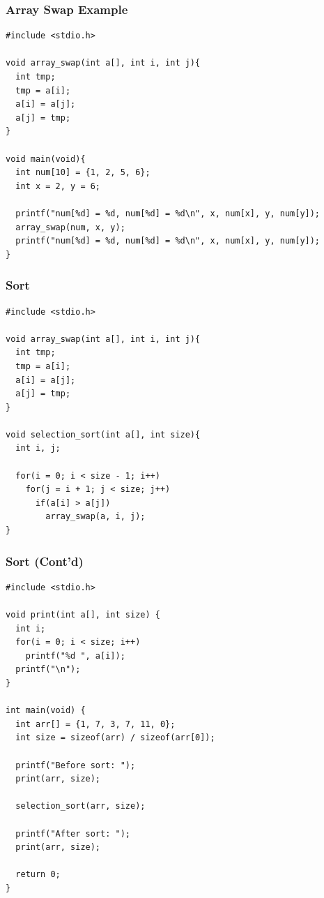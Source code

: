 \documentclass{../c-lecture}
\begin{document}
\begin{frame}[fragile]
  \frametitle{Array Swap Example}
  \scriptsize
  \begin{verbatim}
#include <stdio.h>

void array_swap(int a[], int i, int j){
  int tmp;
  tmp = a[i];
  a[i] = a[j];
  a[j] = tmp;
}

void main(void){
  int num[10] = {1, 2, 5, 6};
  int x = 2, y = 6;

  printf("num[%d] = %d, num[%d] = %d\n", x, num[x], y, num[y]);
  array_swap(num, x, y);
  printf("num[%d] = %d, num[%d] = %d\n", x, num[x], y, num[y]);
}
  \end{verbatim}
\end{frame}

\begin{frame}[fragile]
  \frametitle{Sort}
  \scriptsize
  \begin{verbatim}
#include <stdio.h>

void array_swap(int a[], int i, int j){
  int tmp;
  tmp = a[i];
  a[i] = a[j];
  a[j] = tmp;
}

void selection_sort(int a[], int size){
  int i, j;

  for(i = 0; i < size - 1; i++)
    for(j = i + 1; j < size; j++)
      if(a[i] > a[j])
        array_swap(a, i, j);
}
  \end{verbatim}
\end{frame}

\begin{frame}[fragile]
  \frametitle{Sort (Cont'd)}
  \scriptsize
  \begin{verbatim}
#include <stdio.h>

void print(int a[], int size) {
  int i;
  for(i = 0; i < size; i++)
    printf("%d ", a[i]);
  printf("\n");
}

int main(void) {
  int arr[] = {1, 7, 3, 7, 11, 0};
  int size = sizeof(arr) / sizeof(arr[0]);

  printf("Before sort: ");
  print(arr, size);

  selection_sort(arr, size);

  printf("After sort: ");
  print(arr, size);

  return 0;
}
  \end{verbatim}
\end{frame}
\end{document}
